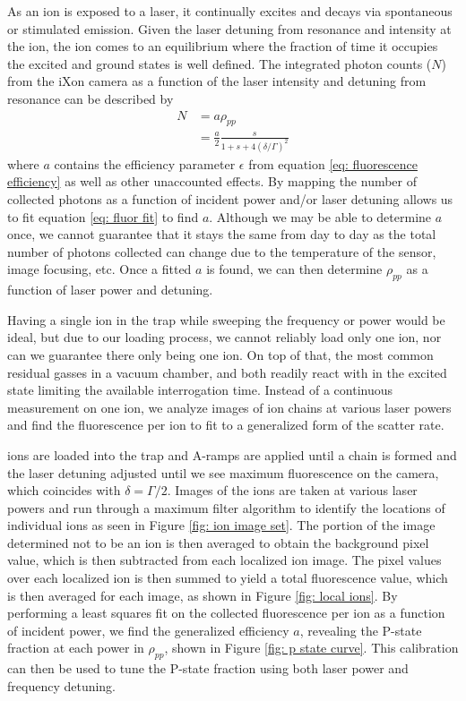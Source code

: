As an ion is exposed to a laser, it continually excites and decays via spontaneous or stimulated emission. Given the laser detuning from resonance and intensity at the ion, the ion comes to an equilibrium where the fraction of time it occupies the excited and ground states is well defined. The integrated photon counts ($N$) from the iXon camera as a function of the laser intensity and detuning from resonance can be described by
\begin{align}
	N & = a \rho_{pp} \nonumber \\
	& = \frac{a}{2}\frac{s}{1+s+4(\delta/\Gamma)^2} \label{eq: fluor fit}
\end{align}
where $a$ contains the efficiency parameter $\epsilon$ from equation \ref{eq: fluorescence efficiency} as well as other unaccounted effects. By mapping the number of collected photons as a function of incident power and/or laser detuning allows us to fit equation \ref{eq: fluor fit} to find $a$. Although we may be able to determine $a$ once, we cannot guarantee that it stays the same from day to day as the total number of photons collected can change due to the temperature of the sensor, image focusing, etc. Once a fitted $a$ is found, we can then determine $\rho_{pp}$ as a function of laser power and detuning.

Having a single ion in the trap while sweeping the frequency or power would be ideal, but due to our loading process, we cannot reliably load only one ion, nor can we guarantee there only being one ion. On top of that, the most common residual gasses in a vacuum chamber,  and  both readily react with  in the excited state limiting the available interrogation time. Instead of a continuous measurement on one ion, we analyze images of ion chains at various laser powers and find the fluorescence per ion to fit to a generalized form of the scatter rate.

 ions are loaded into the trap and A-ramps are applied until a chain is formed and the laser detuning adjusted until we see maximum fluorescence on the camera, which coincides with $\delta=\Gamma/2$. Images of the ions are taken at various laser powers and run through a maximum filter algorithm to identify the locations of individual  ions as seen in Figure \ref{fig: ion image set}. The portion of the image determined not to be an ion is then averaged to obtain the background pixel value, which is then subtracted from each localized ion image. The pixel values over each localized ion is then summed to yield a total fluorescence value, which is then averaged for each image, as shown in Figure \ref{fig: local ions}. By performing a least squares fit on the collected fluorescence per ion as a function of incident power, we find the generalized efficiency $a$, revealing the P-state fraction at each power in $\rho_{pp}$, shown in Figure \ref{fig: p state curve}. This calibration can then be used to tune the P-state fraction using both laser power and frequency detuning.

